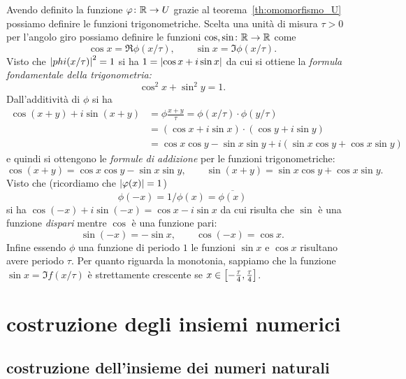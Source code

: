 Avendo definito la funzione $\varphi\colon {\mathbb R}\to U$ grazie 
al teorema~\ref{th:omomorfismo_U} possiamo definire le 
funzioni trigonometriche. 
Scelta una unità di misura $\tau > 0$ per l'angolo giro
possiamo definire le funzioni $\cos, \sin \colon {\mathbb R} \to {\mathbb R}$ come 
\[
 \cos x = \Re \phi(x/\tau), \qquad
 \sin x = \Im \phi(x/\tau).
\]
Visto che ${\left|phi(x/\tau)\right|}^2=1$ si ha $1 = {\left|\cos x + i \sin x\right|}$ da cui 
si ottiene la \emph{formula fondamentale della trigonometria:}
\[
\cos^2 x + \sin^2 y = 1.  
\]  
Dall'additività di $\phi$ si ha
\begin{align*}
  \cos(x+y) + i\sin(x+y)
  &= \phi\frac{x+y}{\tau} 
  = \phi(x/\tau) \cdot \phi(y/\tau)\\
  &= (\cos x + i\sin x) \cdot (\cos y + i \sin y)\\
  &= \cos x\cos y - \sin x \sin y + i (\sin x\cos y + \cos x \sin y)
\end{align*}
e quindi si ottengono le \emph{formule di addizione} 
per le funzioni trigonometriche:
\[
\cos(x+y) = \cos x\cos y - \sin x \sin y, \qquad 
\sin(x+y) = \sin x \cos y + \cos x\sin y.  
\]
Visto che (ricordiamo che ${\left|\varphi(x)\right|}=1$)
\[
  \phi(-x) = 1/\phi(x) = \overline{\phi(x)}
\]
si ha $\cos(-x)+i\sin(-x) = \cos x-i\sin x$ 
da cui risulta che $\sin$ è una funzione \emph{dispari}
mentre $\cos$ è una funzione pari:
\[
\sin(-x) = -\sin x,\qquad 
\cos(-x) = \cos x.  
\]
Infine essendo $\phi$ una funzione di periodo $1$ le funzioni $\sin x$ 
e $\cos x$ risultano avere periodo $\tau$.
Per quanto riguarda la monotonia, sappiamo che 
la funzione $\sin x = \Im f(x/\tau)$ è 
strettamente crescente se $x\in\left[-\frac \tau 4,\frac \tau 4\right]$.

\section{costruzione degli insiemi numerici}

\subsection{costruzione dell'insieme dei numeri naturali}

